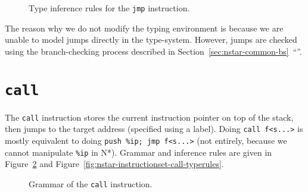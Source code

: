 \begin{figure}[H]
  \centering

  \begin{prooftree}
  \end{prooftree}

  \caption{Type inference rules for the \texttt{jmp} instruction.}
  \label{fig:nstar-instructionset-jmp-typerules}
\end{figure}

The reason why we do not modify the typing environment is because we are unable to model jumps directly in the type-system.
However, jumps are checked using the branch-checking process described in Section~\ref{sec:nstar-common-bs}~``''.

\section{\texttt{call}}\label{sec:nstar-instructionset-call}

The \texttt{call} instruction stores the current instruction pointer on top of the stack, then jumps to the target address (specified using a label).
Doing \texttt{call f<s...>} is mostly equivalent to doing \texttt{push \%ip; jmp f<s...>} (not entirely, because we cannot manipulate \texttt{\%ip} in N*).
Grammar and inference rules are given in Figure~\ref{fig:nstar-instructionset-call-grammar} and Figure~\ref{fig:nstar-instructionset-call-typerules}.

\begin{figure}[H]
  \centering


  \caption{Grammar of the \texttt{call} instruction.}
  \label{fig:nstar-instructionset-call-grammar}
\end{figure}

